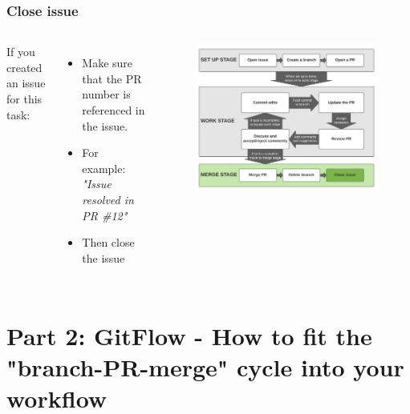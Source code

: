 \documentclass[aspectratio=169]{beamer} %
\begin{document}
\begin{frame}
	\frametitle{Close issue}
	\begin{columns}[c]
		
		If you created an issue for this task:
		\begin{itemize}
			\setlength\itemsep{.5em}
			\item Make sure that the PR number is referenced in the issue. 
			\item For example: \textit{"Issue resolved in PR \#12"}
			\item Then close the issue
		\end{itemize}
		
		\vspace{-.75cm}
		\begin{figure}
			\centering
			\includegraphics[width=\textwidth]{./img/branch-pr-merge-cycle-S3-3.png}
		\end{figure}
		
	\end{columns}
\end{frame}



\section{Part 2: \newline GitFlow - How to fit the "branch-PR-merge" cycle into your workflow}





\end{document}
